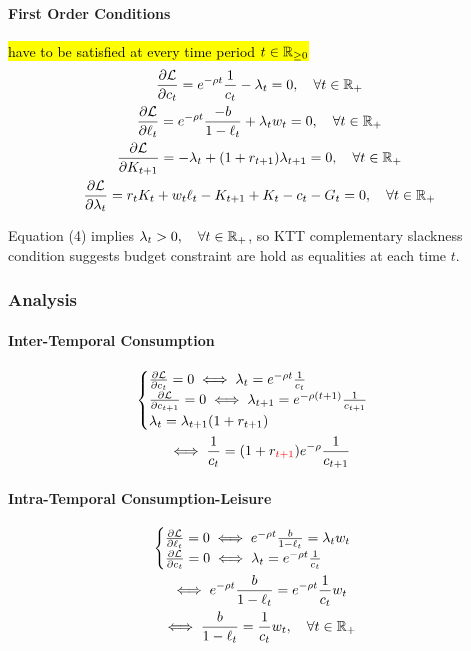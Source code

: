 \documentclass[11pt]{article}
\begin{document}
			\paragraph{First Order Conditions}\hl{have to be satisfied at every time period $t \in \mathbb{R}_{\geq 0}$}
			\begin{gather}
				\frac{\partial{\mathcal{{L}}}}{\partial{c_t}} = e^{-\rho t}\frac{1}{c_t} - \lambda_t = 0,\quad \forall t \in \mathbb{R}_+ \\
				\frac{\partial{\mathcal{{L}}}}{\partial{\ell_t}} = e^{-\rho t} \frac{-b}{1-\ell_t} + \lambda_t w_t = 0,\quad \forall t \in \mathbb{R}_+ \\
				\frac{\partial{\mathcal{{L}}}}{\partial{K_{t+1}}} = -\lambda_t + (1+r_{t+1})\lambda_{t+1} = 0,\quad \forall t \in \mathbb{R}_+ \\
				\frac{\partial{\mathcal{{L}}}}{\partial{\lambda_t}} = r_t K_t + w_t \ell_t - K_{t+1} + K_t - c_t - G_t = 0,\quad \forall t \in \mathbb{R}_+
			\end{gather}
			\begin{remark}
				Equation (4) implies $\lambda_t > 0,\quad \forall t \in \mathbb{R}_+$, so KTT complementary slackness condition suggests budget constraint are hold as equalities at each time $t$.
			\end{remark}
			
			\subsubsection{Analysis}
			
			\paragraph{Inter-Temporal Consumption}
				\begin{gather}
					\begin{cases}
						\frac{\partial{\mathcal{{L}}}}{\partial{c_t}} = 0 \iff \lambda_t = e^{-\rho t}\frac{1}{c_t} \\
						\frac{\partial{\mathcal{{L}}}}{\partial{c_{t+1}}} = 0 \iff \lambda_{t+1} = e^{-\rho (t+1)}\frac{1}{c_{t+1}} \\
						\lambda_t = \lambda_{t+1}(1+r_{t+1})
					\end{cases}\\
					\iff \frac{1}{c_t} = (1+r_{\textcolor{red}{t+1}})e^{-\rho}\frac{1}{c_{t+1}}
				\end{gather}
				
			\paragraph{Intra-Temporal Consumption-Leisure}
				\begin{gather}
					\begin{cases}
						\frac{\partial{\mathcal{{L}}}}{\partial{\ell_t}} = 0 \iff e^{-\rho t} \frac{b}{1-\ell_t} = \lambda_t w_t \\
						\frac{\partial{\mathcal{{L}}}}{\partial{c_t}} = 0 \iff \lambda_t = e^{-\rho t}\frac{1}{c_t}
					\end{cases} \\
					\iff e^{-\rho t} \frac{b}{1-\ell_t} = e^{-\rho t}\frac{1}{c_t} w_t \\
					\iff \frac{b}{1-\ell_t} = \frac{1}{c_t} w_t,\quad \forall t \in \mathbb{R}_+
				\end{gather}
				
\end{document}
